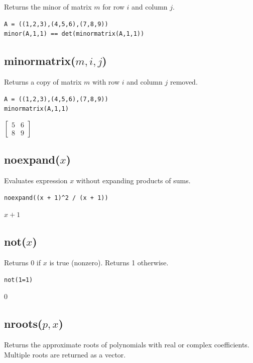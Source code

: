 \documentclass[12pt]{article}
\begin{document}
Returns the minor of matrix $m$ for row $i$ and column $j$.

{\color{blue}
\begin{verbatim}
A = ((1,2,3),(4,5,6),(7,8,9))
minor(A,1,1) == det(minormatrix(A,1,1))
\end{verbatim}
}


\subsection*{minormatrix($m,i,j$)}

Returns a copy of matrix $m$ with row $i$ and column $j$ removed.

{\color{blue}
\begin{verbatim}
A = ((1,2,3),(4,5,6),(7,8,9))
minormatrix(A,1,1)
\end{verbatim}
}

\noindent
$\displaystyle
\begin{bmatrix}
5 & 6
\\[1ex]
8 & 9
\end{bmatrix}
$

\subsection*{noexpand($x$)}

Evaluates expression $x$ without expanding products of sums.

{\color{blue}
\begin{verbatim}
noexpand((x + 1)^2 / (x + 1))
\end{verbatim}
}

\noindent
$x + 1$

\subsection*{not($x$)}

Returns 0 if $x$ is true (nonzero).
Returns 1 otherwise.

{\color{blue}
\begin{verbatim}
not(1=1)
\end{verbatim}
}

\noindent
$0$

\subsection*{nroots($p,x$)}

Returns the approximate roots of polynomials with real or complex coefficients.
Multiple roots are returned as a vector.
\end{document}

